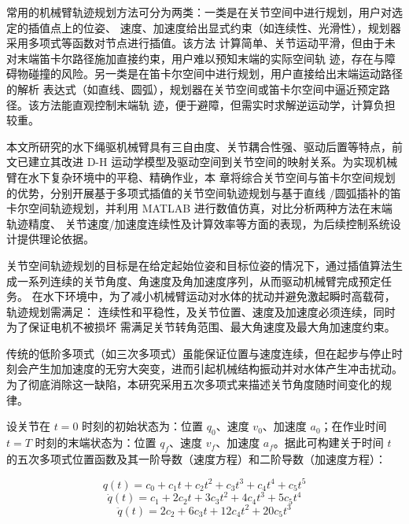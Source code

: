 





常用的机械臂轨迹规划方法可分为两类：一类是在关节空间中进行规划，用户对选定的插值点上的位姿、
速度、加速度给出显式约束（如连续性、光滑性），规划器采用多项式等函数对节点进行插值。该方法
计算简单、关节运动平滑，但由于未对末端笛卡尔路径施加直接约束，用户难以预知末端的实际空间轨
迹，存在与障碍物碰撞的风险。另一类是在笛卡尔空间中进行规划，用户直接给出末端运动路径的解析
表达式（如直线、圆弧），规划器在关节空间或笛卡尔空间中逼近预定路径。该方法能直观控制末端轨
迹，便于避障，但需实时求解逆运动学，计算负担较重。

本文所研究的水下绳驱机械臂具有三自由度、关节耦合性强、驱动后置等特点，前文已建立其改进 D-H 
运动学模型及驱动空间到关节空间的映射关系。为实现机械臂在水下复杂环境中的平稳、精确作业，本
章将综合关节空间与笛卡尔空间规划的优势，分别开展基于多项式插值的关节空间轨迹规划与基于直线
/圆弧插补的笛卡尔空间轨迹规划，并利用 MATLAB 进行数值仿真，对比分析两种方法在末端轨迹精度、
关节速度/加速度连续性及计算效率等方面的表现，为后续控制系统设计提供理论依据。


关节空间轨迹规划的目标是在给定起始位姿和目标位姿的情况下，通过插值算法生成一系列连续的关节角度、角速度及角加速度序列，从而驱动机械臂完成预定任务。
在水下环境中，为了减小机械臂运动对水体的扰动并避免激起瞬时高载荷，轨迹规划需满足：
连续性和平稳性，及关节位置、速度及加速度必须连续，同时为了保证电机不被损坏 需满足关节转角范围、最大角速度及最大角加速度约束。

传统的低阶多项式（如三次多项式）虽能保证位置与速度连续，但在起步与停止时刻会产生加加速度的无穷大突变，进而引起机械结构振动并对水体产生冲击扰动。为了彻底消除这一缺陷，本研究采用五次多项式来描述关节角度随时间变化的规律。

设关节在 $t=0$ 时刻的初始状态为：位置 $q_0$、速度 $v_0$、加速度 $a_0$；在作业时间 $t=T$ 时刻的末端状态为：位置 $q_f$、速度 $v_f$、加速度 $a_f$。据此可构建关于时间 $t$ 的五次多项式位置函数及其一阶导数（速度方程）和二阶导数（加速度方程）：

\begin{equation}
    q(t) = c_0 + c_1 t + c_2 t^2 + c_3 t^3 + c_4 t^4 + c_5 t^5
\end{equation}
\begin{equation}
    \dot{q}(t) = c_1 + 2c_2 t + 3c_3 t^2 + 4c_4 t^3 + 5c_5 t^4
\end{equation}
\begin{equation}
    \ddot{q}(t) = 2c_2 + 6c_3 t + 12c_4 t^2 + 20c_5 t^3
\end{equation}

